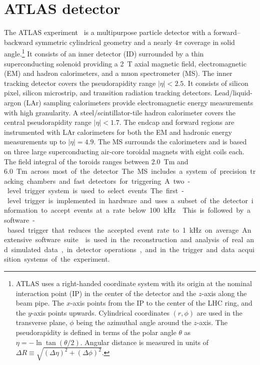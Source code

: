 \documentclass[cernpreprint, backref=false, texlive=2020, UKenglish, dvipsnames, block=none, texmf]{atlasdoc}
\begin{document}
 
 
\section{ATLAS detector}
 
 
The ATLAS experiment~\cite{PERF-2007-01,PIX-2018-001} is a multipurpose particle detector
with a forward--backward symmetric cylindrical geometry and a nearly \(4\pi\) coverage in
solid angle.\footnote{ATLAS uses a right-handed coordinate system with its origin at the nominal interaction point (IP)
in the center of the detector and the \(z\)-axis along the beam pipe.
The \(x\)-axis points from the IP to the center of the LHC ring,
and the \(y\)-axis points upwards.
Cylindrical coordinates \((r,\phi)\) are used in the transverse plane,
\(\phi\) being the azimuthal angle around the \(z\)-axis.
The pseudorapidity is defined in terms of the polar angle \(\theta\) as \(\eta = -\ln \tan(\theta/2)\).
Angular distance is measured in units of \(\Delta R \equiv \sqrt{(\Delta\eta)^{2} + (\Delta\phi)^{2}}\).} It consists of an inner  detector (ID) surrounded by a thin superconducting solenoid
providing a \SI{2}{\tesla} axial magnetic field, electromagnetic (EM) and hadron calorimeters, and a muon spectrometer (MS).
The inner tracking detector covers the pseudorapidity range \(|\eta| < 2.5\).
It consists of silicon pixel, silicon microstrip, and transition radiation tracking detectors.
Lead/liquid-argon (LAr)  sampling calorimeters provide electromagnetic energy measurements
with high granularity.
A steel/scintillator-tile hadron calorimeter covers the central pseudorapidity range $|\eta| < 1.7$.
The endcap and forward regions are instrumented with LAr calorimeters
for both the EM and hadronic energy measurements up to \(|\eta| = 4.9\).
The MS surrounds the calorimeters and is based on
three large superconducting air-core toroidal magnets with eight coils each.
The field integral of the toroids ranges between \num{2.0}~Tm and \SI{6.0}Tm
across most of the detector.
The MS includes a system of precision tracking chambers and fast detectors for triggering.
A two-level trigger system is used to select events.
The first-level trigger is implemented in hardware and uses a subset of the detector information
to accept events at a rate below \SI{100}{\kHz}~\cite{TRIG-2016-01}.
This is followed by a software-based trigger that
reduces the accepted event rate to \SI{1}{\kHz} on average.
An extensive software suite~\cite{ATL-SOFT-PUB-2020-001} is used in the reconstruction and analysis of real and simulated data, in detector operations, and in the trigger and data acquisition systems of the experiment.
 
\end{document}
